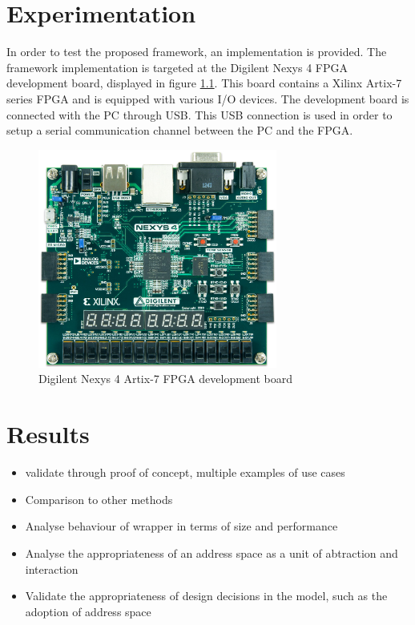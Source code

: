 \documentclass[main.tex]{subfiles}
\begin{document}
\chapter{Experimentation}

In order to test the proposed framework, an implementation is provided. The framework implementation is targeted at the Digilent Nexys 4 FPGA development board, displayed in figure \ref{fig:nexys4}. This board contains a Xilinx Artix-7 series FPGA and is equipped with various I/O devices. The development board is connected with the PC through USB. This USB connection is used in order to setup a serial communication channel between the PC and the FPGA.

\begin{figure}
\centering
\includegraphics[width=0.7\textwidth]{img/nexys4-small}
\caption{Digilent Nexys 4 Artix-7 FPGA development board}
\label{fig:nexys4}
\end{figure}


\chapter{Results}
\begin{itemize}
    \item validate through proof of concept, multiple examples of use cases
    \item Comparison to other methods
    \item Analyse behaviour of wrapper in terms of size and performance
    \item Analyse the appropriateness of an address space as a unit of abtraction and interaction
    \item Validate the appropriateness of design decisions in the model, such as the adoption of address space
    
\end{itemize}
\end{document}
